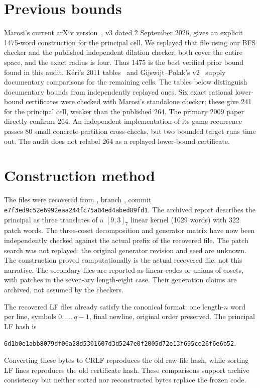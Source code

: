 \documentclass[11pt]{article}
\begin{document}
\section{Previous bounds}
Marosi's current arXiv version~\cite{marosi}, v3 dated 2 September 2026, gives an
explicit 1475-word construction for the principal cell. We replayed that file
using our BFS checker and the published independent dilation checker; both cover
the entire space, and the exact radius is four. Thus 1475 is the best verified
prior bound found in this audit. K\'eri's 2011 tables~\cite{keri} and Gijswijt--Polak's
v2~\cite{gp} supply documentary comparisons for the remaining cells.
The tables below distinguish documentary bounds from independently replayed ones.
Six exact rational lower-bound certificates were checked with Marosi's standalone
checker; these give 241 for the principal cell, weaker than the published 264.
The primary 2009 paper~\cite{hhsp} directly confirms 264. An independent
implementation of its game recurrence passes 80 small concrete-partition
cross-checks, but two bounded target runs time out. The audit does not relabel
264 as a replayed lower-bound certificate.

\section{Construction method}
The files were recovered from , branch
, commit
\texttt{e7f3ed9c52e6992eaa244fc75a04ed4abed89fd1}.
The archived report describes the principal as three translates of a
$[9,3]_7$ linear kernel (1029 words) with 322 patch words. The three-coset decomposition and generator matrix have now been independently
checked against the actual prefix of the recovered file. The patch search was
not replayed: the original generator
revision and seed are unknown. The construction proved computationally is the
actual recovered file, not this narrative. The secondary files are reported as
linear codes or unions of cosets, with patches in the seven-ary length-eight case.
Their generation claims are archived, not assumed by the checkers.

The recovered LF files already satisfy the canonical format: one length-$n$
word per line, symbols $0,\ldots,q-1$, final newline, original order preserved.
The principal LF hash is
\begin{center}\small
\texttt{6d1b0e1abb8079df06a28d5301607d3d5247e0f2005d72e13f695ce26f6e6b52}.
\end{center}
Converting these bytes to CRLF reproduces the old raw-file hash, while sorting
LF lines reproduces the old certificate hash. These comparisons support archive
consistency but neither sorted nor reconstructed bytes replace the frozen code.
\end{document}
